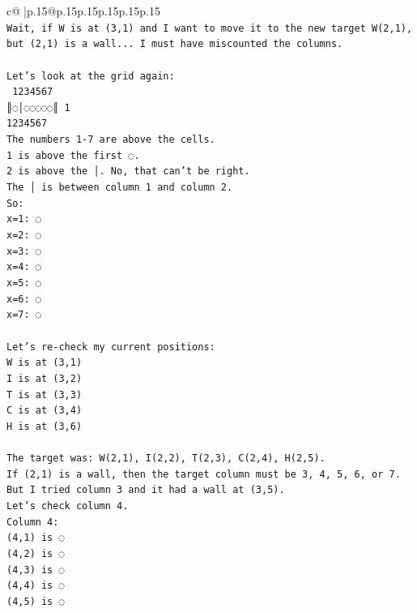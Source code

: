 \documentclass{article}
\begin{document}
{\begin{supertabular}{c@{$\;$}|p{.15\linewidth}@{}p{.15\linewidth}p{.15\linewidth}p{.15\linewidth}p{.15\linewidth}p{.15\linewidth}}
{{{\\ 
\texttt{Wait, if W is at (3,1) and I want to move it to the new target W(2,1), but (2,1) is a wall... I must have miscounted the columns.} \\
\\ 
\texttt{Let's look at the grid again:} \\
\texttt{ 1234567} \\
\texttt{║◌│◌◌◌◌◌║ 1} \\
\texttt{1234567} \\
\texttt{The numbers 1{-}7 are above the cells.} \\
\texttt{1 is above the first ◌.} \\
\texttt{2 is above the │. No, that can't be right.} \\
\texttt{The │ is between column 1 and column 2.} \\
\texttt{So:} \\
\texttt{x=1: ◌} \\
\texttt{x=2: ◌} \\
\texttt{x=3: ◌} \\
\texttt{x=4: ◌} \\
\texttt{x=5: ◌} \\
\texttt{x=6: ◌} \\
\texttt{x=7: ◌} \\
\\ 
\texttt{Let's re{-}check my current positions:} \\
\texttt{W is at (3,1)} \\
\texttt{I is at (3,2)} \\
\texttt{T is at (3,3)} \\
\texttt{C is at (3,4)} \\
\texttt{H is at (3,6)} \\
\\ 
\texttt{The target was: W(2,1), I(2,2), T(2,3), C(2,4), H(2,5).} \\
\texttt{If (2,1) is a wall, then the target column must be 3, 4, 5, 6, or 7.} \\
\texttt{But I tried column 3 and it had a wall at (3,5).} \\
\texttt{Let's check column 4.} \\
\texttt{Column 4:} \\
\texttt{(4,1) is ◌} \\
\texttt{(4,2) is ◌} \\
\texttt{(4,3) is ◌} \\
\texttt{(4,4) is ◌} \\
\texttt{(4,5) is ◌} \\
}}}
\end{supertabular}}
\end{document}

